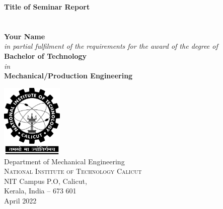 \begin{titlepage}

\begin{center}



\Large \textbf {Title of Seminar Report}\\[0.3in]

\textup{} \\[0.3in]
 \\[0.1in]
\textup{\textbf{Your Name}} \\[0.1in]
\small \textit{in partial fulfilment of the requirements for the award of the degree of} \\[0.25in]
\large \textbf{Bachelor of Technology}\\[0.1in]
\textit{in}\\[0.1in]
\large \textbf\bf {Mechanical/Production Engineering}\\[0.1in]
\vspace{.1in}
  
\vfill

\includegraphics[width=1.16in]{nitc-logo}\\[0.1in]
\Large{Department of Mechanical Engineering}\\
\normalsize
\textsc{National Institute of Technology Calicut}\\
NIT Campus P.O, Calicut,\\
Kerala, India -- 673 601 \\
\vspace{0.3cm}
April 2022

\end{center}

\end{titlepage}
